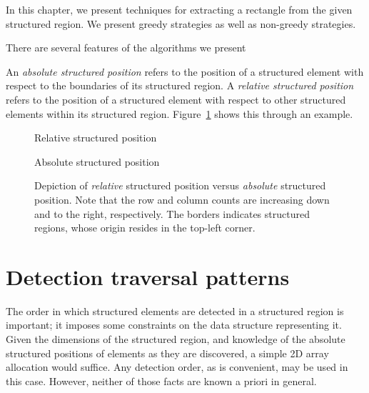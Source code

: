 In this chapter, we present techniques for extracting a rectangle from the given structured region. We present greedy strategies as well as non-greedy strategies.


There are several features of the algorithms we present


An \emph{absolute structured position} refers to the position of a structured element with respect to the boundaries of its structured region.
A \emph{relative structured position} refers to the position of a structured element with respect to other structured elements within its structured region. Figure~\ref{fig:structured-position} shows this through an example.


\begin{figure}
\newcommand{\nodesize}{1.2}
\newcommand{\rows}{4}
\newcommand{\cols}{4}
\newcommand{\rowsize}{\rows*\nodesize}
\newcommand{\colsize}{\cols*\nodesize+2*0.1}

\newcommand{\nodeat}[3]{
	\pgfmathsetmacro{\lerow}{ (\rows - #1) * \nodesize - (\nodesize / 2) - 0.1}
	\pgfmathsetmacro{\lecol}{ (#2 * \nodesize) + (\nodesize / 2) + 0.1}
	\node at (\lecol, \lerow) {#3}
}

\sidebyside
{
	\caption{Relative structured position\label{fig:relative-structured-position}}
}
{
	\caption{Absolute structured position\label{fig:absolute-structured-position}}
}
\caption{Depiction of \emph{relative} structured position versus \emph{absolute} structured position. Note that the row and column counts are increasing down and to the right, respectively. The borders indicates structured regions, whose origin resides in the top-left corner.\label{fig:structured-position}}
\end{figure}


\section{Detection traversal patterns}
The order in which structured elements are detected in a structured region is important; it imposes some constraints on the data structure representing it. Given the dimensions of the structured region, and knowledge of the absolute structured positions of elements as they are discovered, a simple 2D array allocation would suffice. Any detection order, as is convenient, may be used in this case. However, neither of those facts are known a priori in general.

